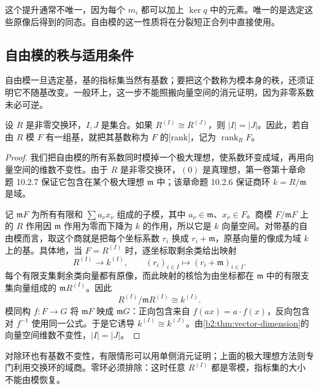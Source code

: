 这个提升通常不唯一，因为每个 \(m_i\) 都可以加上 \(\ker q\) 中的元素。唯一的是选定这些原像后得到的同态。自由模的这一性质将在分裂短正合列中直接使用。

\subsection{自由模的秩与适用条件}
\label{b2:subsec:0301:02}

自由模一旦选定基，基的指标集当然有基数；要把这个数称为模本身的秩，还须证明它不随基改变。一般环上，这一步不能照搬向量空间的消元证明，因为非零系数未必可逆。

\begin{theorem}[交换环上自由模的秩不变性]\label{b2:thm:free-rank-invariance}
	设 \(R\) 是非零交换环，\(I,J\) 是集合。如果 \(R^{(I)}\cong R^{(J)}\)，则 \(|I|=|J|\)。因此，若自由 \(R\) 模 \(F\) 有一组基，就把其基数称为 \(F\) 的[rank]，记为 \(\operatorname{rank}_R F\)。
\end{theorem}
\begin{proof}
	我们把自由模的所有系数同时模掉一个极大理想，使系数环变成域，再用向量空间的维数不变性。由于 \(R\) 是非零交换环，\((0)\) 是真理想，第一卷第十章命题 10.2.7 保证它包含在某个极大理想 \(\mathfrak m\) 中；该章命题 10.2.6 保证商环 \(k=R/\mathfrak m\) 是域。

	记 \(\mathfrak mF\) 为所有有限和 \(\sum a_\nu x_\nu\) 组成的子模，其中 \(a_\nu\in\mathfrak m\)、\(x_\nu\in F\)。商模 \(F/\mathfrak mF\) 上的 \(R\) 作用因 \(\mathfrak m\) 作用为零而下降为 \(k\) 的作用，所以它是 \(k\) 向量空间。对带基的自由模而言，取这个商就是把每个坐标系数 \(r_i\) 换成 \(r_i+\mathfrak m\)，原基向量的像成为域 \(k\) 上的基。具体地，当 \(F=R^{(I)}\) 时，逐坐标取剩余类给出映射
	\[
		R^{(I)}\longrightarrow k^{(I)},\qquad (r_i)_{i\in I}\longmapsto(r_i+\mathfrak m)_{i\in I}.
	\]
	每个有限支集剩余类向量都有原像，而此映射的核恰为由坐标都在 \(\mathfrak m\) 中的有限支集向量组成的 \(\mathfrak mR^{(I)}\)。因此
	\[
		R^{(I)}/\mathfrak mR^{(I)}\cong k^{(I)}.
	\]
	模同构 \(f:F\to G\) 将 \(\mathfrak mF\) 映成 \(\mathfrak mG\)：正向包含来自 \(f(ax)=a\cdot f(x)\)，反向包含对 \(f^{-1}\) 使用同一公式。于是它诱导 \(k^{(I)}\cong k^{(J)}\)。由\cref{b2:thm:vector-dimension}的向量空间维数不变性，\(|I|=|J|\)。
\end{proof}

对除环也有基数不变性，有限情形可以用单侧消元证明；上面的极大理想方法则专门利用交换环的域商。零环必须排除：这时任意 \(R^{(I)}\) 都是零模，指标集的大小不能由模恢复。

